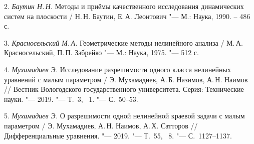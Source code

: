 2. {\it Баутин Н.\,Н. }
Методы и приёмы качественного исследования динамических систем на
плоскости / Н.\,Н. Баутин, Е.\,А. Леонтович "--- М.: Наука, 1990.
-- 486 с.

3. {\it Красносельский М.\,А. }
Геометрические методы нелинейного анализа / М.\,А. Красносельский,
П.\,П. Забрейко "--- М.: Наука, 1975. "--- 512 с.

4. {\it Мухамадиев Э. }
Исследование разрешимости одного класса нелинейных уравнений с
малым параметром  / Э. Мухамадиев, А.\,Б. Назимов, А.\,Н. Наимов
// Вестник Вологодского государственного университета. Серия:
Технические науки. "--- 2019. "--- Т.~3, \No~1. "--- С.~50--53.

5. {\it Мухамадиев Э. }
О разрешимости одной нелинейной краевой задачи с малым параметром
/ Э. Мухамадиев, А.\,Н. Наимов, А.\,Х. Сатторов
// Дифференциальные уравнения. "--- 2019. "--- Т.~55, \No~8. "--- С.~1127--1137.
